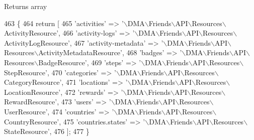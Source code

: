 \begin{DoxyReturn}{Returns}
array 
\end{DoxyReturn}

\begin{DoxyCode}
463     \{
464         \textcolor{keywordflow}{return} [
465             \textcolor{stringliteral}{'activities'}            => \textcolor{stringliteral}{'\(\backslash\)DMA\(\backslash\)Friends\(\backslash\)API\(\backslash\)Resources\(\backslash\)ActivityResource'},
466             \textcolor{stringliteral}{'activity-logs'}         => \textcolor{stringliteral}{'\(\backslash\)DMA\(\backslash\)Friends\(\backslash\)API\(\backslash\)Resources\(\backslash\)ActivityLogResource'},
467             \textcolor{stringliteral}{'activity-metadata'}     => \textcolor{stringliteral}{'\(\backslash\)DMA\(\backslash\)Friends\(\backslash\)API\(\backslash\)Resources\(\backslash\)ActivityMetadataResource'},
468             \textcolor{stringliteral}{'badges'}                => \textcolor{stringliteral}{'\(\backslash\)DMA\(\backslash\)Friends\(\backslash\)API\(\backslash\)Resources\(\backslash\)BadgeResource'},
469             \textcolor{stringliteral}{'steps'}                 => \textcolor{stringliteral}{'\(\backslash\)DMA\(\backslash\)Friends\(\backslash\)API\(\backslash\)Resources\(\backslash\)StepResource'},
470             \textcolor{stringliteral}{'categories'}            => \textcolor{stringliteral}{'\(\backslash\)DMA\(\backslash\)Friends\(\backslash\)API\(\backslash\)Resources\(\backslash\)CategoryResource'},
471             \textcolor{stringliteral}{'locations'}             => \textcolor{stringliteral}{'\(\backslash\)DMA\(\backslash\)Friends\(\backslash\)API\(\backslash\)Resources\(\backslash\)LocationResource'},
472             \textcolor{stringliteral}{'rewards'}               => \textcolor{stringliteral}{'\(\backslash\)DMA\(\backslash\)Friends\(\backslash\)API\(\backslash\)Resources\(\backslash\)RewardResource'},
473             \textcolor{stringliteral}{'users'}                 => \textcolor{stringliteral}{'\(\backslash\)DMA\(\backslash\)Friends\(\backslash\)API\(\backslash\)Resources\(\backslash\)UserResource'},
474             \textcolor{stringliteral}{'countries'}             => \textcolor{stringliteral}{'\(\backslash\)DMA\(\backslash\)Friends\(\backslash\)API\(\backslash\)Resources\(\backslash\)CountryResource'},   
475             \textcolor{stringliteral}{'countries.states'}      => \textcolor{stringliteral}{'\(\backslash\)DMA\(\backslash\)Friends\(\backslash\)API\(\backslash\)Resources\(\backslash\)StateResource'},
476         ];
477     \}
\end{DoxyCode}
\hypertarget{classDMA_1_1Friends_1_1Plugin_aee1fcfd6978df90e396e75223e24080a}{}
